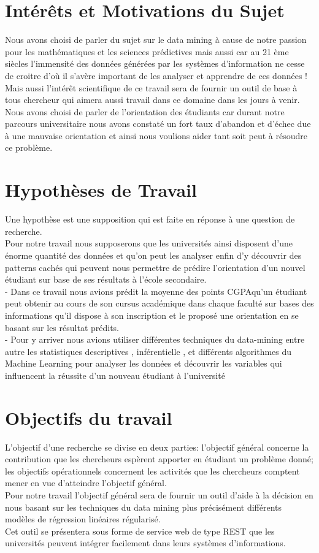 \section{Intérêts et Motivations du Sujet}
Nous avons choisi de parler du sujet sur le data mining à cause de notre passion pour les mathématiques et les sciences prédictives mais aussi car au 21 ème siècles l'immensité des données générées par les systèmes d'information ne cesse de croitre d'où il s'avère important de les analyser et apprendre de ces données !\\
Mais aussi l'intérêt scientifique de ce travail sera de fournir un outil de base à tous chercheur qui aimera aussi travail dans ce domaine dans les jours à venir. \\
Nous avons choisi de parler de l'orientation des étudiants car durant notre parcours universitaire nous avons constaté un fort taux d'abandon et d'échec due à une mauvaise orientation et ainsi nous voulions aider tant soit peut à résoudre ce problème. 
\section{Hypothèses de Travail}
Une hypothèse est  une supposition qui est faite en réponse à une question de recherche. \cite{MethFr} \\
Pour notre travail nous supposerons que les universités ainsi disposent d'une énorme quantité des données et qu'on peut les analyser enfin d'y découvrir des patterns cachés qui peuvent nous permettre de prédire l'orientation d'un nouvel étudiant sur base de ses résultats à l'école secondaire.  \\
- Dans ce travail nous avions prédit la moyenne des points \ac{CGPA}qu'un étudiant peut obtenir au cours de son cursus académique  dans chaque faculté sur bases des informations qu'il dispose à son inscription et le proposé une orientation en se basant sur les résultat prédits. \\
- Pour y arriver nous avions utiliser différentes techniques du data-mining entre autre les statistiques descriptives , inférentielle , et différents algorithmes du Machine Learning pour analyser les données et découvrir les variables qui influencent la réussite d'un nouveau étudiant à l'université
\section{Objectifs du travail}
L'objectif d’une recherche se divise en deux parties: l'objectif général concerne la contribution que les chercheurs espèrent apporter en étudiant un problème donné; les objectifs opérationnels concernent les activités que les chercheurs comptent mener en vue
d'atteindre l'objectif général. \cite{MethFr} \\
Pour notre travail l'objectif général sera de fournir un outil d'aide à la décision en nous basant sur les techniques du data mining plus précisément différents modèles de régression linéaires régularisé. \\
Cet outil se présentera sous forme de service web de type \ac{REST} que les universités peuvent intégrer facilement dans leurs systèmes d'informations.
